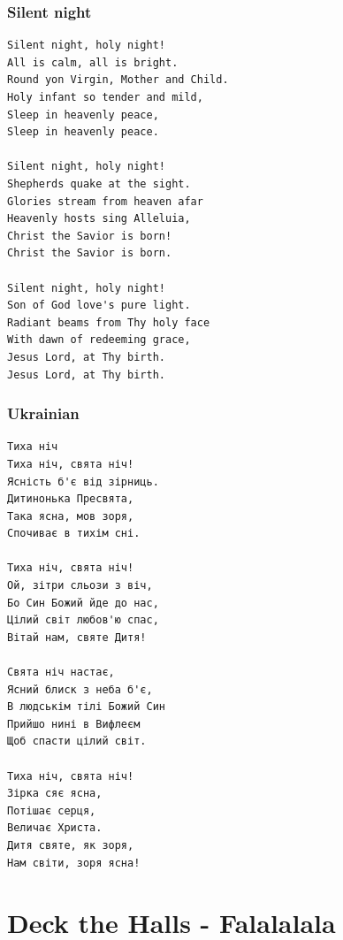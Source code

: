 \documentclass[
]{article}
\begin{document}
\hypertarget{silent-night}{%
\subsubsection*{Silent night}\label{silent-night}}

\begin{verbatim}
Silent night, holy night! 
All is calm, all is bright. 
Round yon Virgin, Mother and Child. 
Holy infant so tender and mild, 
Sleep in heavenly peace, 
Sleep in heavenly peace. 

Silent night, holy night! 
Shepherds quake at the sight. 
Glories stream from heaven afar 
Heavenly hosts sing Alleluia, 
Christ the Savior is born! 
Christ the Savior is born. 

Silent night, holy night! 
Son of God love's pure light. 
Radiant beams from Thy holy face 
With dawn of redeeming grace, 
Jesus Lord, at Thy birth. 
Jesus Lord, at Thy birth.
\end{verbatim}

\hypertarget{ukrainian}{%
\subsubsection*{Ukrainian}\label{ukrainian}}

\begin{verbatim}
Тиха ніч
Тиха ніч, свята ніч!
Ясність б'є від зірниць.
Дитинонька Пресвята,
Така ясна, мов зоря,
Спочиває в тихім сні.

Тиха ніч, свята ніч!
Ой, зітри сльози з віч,
Бо Син Божий йде до нас,
Цілий світ любов'ю спас,
Вітай нам, святе Дитя!

Свята ніч настає,
Ясний блиск з неба б'є,
В людськім тілі Божий Син
Прийшо нині в Вифлеєм
Щоб спасти цілий світ.

Тиха ніч, свята ніч!
Зірка сяє ясна,
Потішає серця,
Величає Христа.
Дитя святе, як зоря,
Нам світи, зоря ясна!
\end{verbatim}

\hypertarget{deck-the-halls---falalalala}{%
\section{Deck the Halls -
Falalalala}\label{deck-the-halls---falalalala}}

\hypertarget{section-2}{%
\subsection*{}\label{section-2}}
\end{document}
